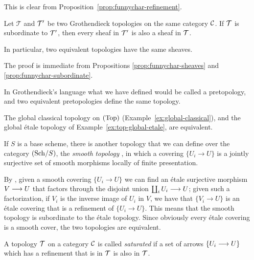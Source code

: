 \begin{2   CONTRAVARIANT FUNCTORS}
\begin{2.3 Sheaves in Grothendieck topologies}
This is clear from Proposition~\ref{prop:funnychar-refinement}.

\begin{proposition}\label{prop:same-sheaves}
Let $\mathcal T$ and $\mathcal{T}'$ be two Grothendieck topologies on the same category $\mathcal{C}$. If $\mathcal{T}$ is subordinate to $\mathcal{T}'$, then every sheaf in $\mathcal{T}'$ is also a sheaf in $\mathcal{T}$.

In particular, two equivalent topologies have the same sheaves.
\end{proposition}

The proof is immediate from Propositions \ref{prop:funnychar-sheaves} and \ref{prop:funnychar-subordinate}.

In Grothendieck's language what we have defined would be called a pretopology, and two equivalent pretopologies define the same topology.

\begin{example}
The global classical topology on $(\mathrm{Top})$ (Example~\ref{ex:global-classical}), and the global \'etale topology of Example~\ref{ex:top-global-etale}, are equivalent.
\end{example}

\begin{example}
If $S$ is a base scheme, there is another topology that we can define over the category $({\mathrm{Sch}/S})$, the \emph{smooth topology}%
%
, in which a covering $\{U_{i}\to U\}$ is a jointly surjective set of smooth morphisms locally of finite presentation.

By \cite[Corollaire~17.16.3]{ega4-4}, given a smooth covering $\{U_{i}\to U\}$ we can find an \'etale surjective morphism $V \arr U$ that factors through the disjoint union $\coprod_{i}U_{i} \arr U$; given such a factorization, if $V_{i}$ is the inverse image of $U_{i}$ in $V$, we have that $\{V_{i} \to U\}$ is an \'etale covering that is a refinement of $\{U_{i}\to U\}$. This means that the smooth topology is subordinate to the \'etale topology. Since obviously every \'etale covering is a smooth cover, the two topologies are equivalent.
\end{example}


\begin{definition}\label{def:saturation}
A topology $\mathcal{T}$ on a category $\mathcal{C}$ is called \emph{saturated}%
%
 if a set of arrows $\{U_{i} \arr U\}$ which has a refinement that is in $\mathcal{T}$ is also in $\mathcal{T}$.


\end{definition}
\end{2.3 Sheaves in Grothendieck topologies}
\end{2   CONTRAVARIANT FUNCTORS}
